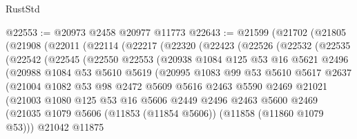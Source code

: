 \begin{lexlean}{RustStd}
\begin{coremodule}
@22553 := @20973 @2458 @20977 @11773
@22643 := @21599
    (@21702
      (@21805
        (@21908
          (@22011
            (@22114
              (@22217
                (@22320
                  (@22423
                    (@22526
                      (@22532
                        (@22535
                          (@22542
                            (@22545
                              (@22550
                                @22553
                                (@20938
                                  @1084
                                  @125
                                  @53
                                  @16
                                  @5621
                                  @2496
                                  (@20988
                                    @1084
                                    @53
                                    @5610
                                    @5619
                                    (@20995
                                      @1083
                                      @99
                                      @53
                                      @5610
                                      @5617
                                      @2637
                                      (@21004
                                        @1082
                                        @53
                                        @98
                                        @2472
                                        @5609
                                        @5616
                                        @2463
                                        @5590
                                        @2469
                                        @21021
                                        (@21003
                                          @1080
                                          @125
                                          @53
                                          @16
                                          @5606
                                          @2449
                                          @2496
                                          @2463
                                          @5600
                                          @2469
                                          (@21035
                                            @1079
                                            @5606
                                            (@11853 (@11854 @5606))
                                            (@11858 (@11860 @1079 @53)))
                                          @21042
                                          @11875

\end{coremodule}
\end{lexlean}
